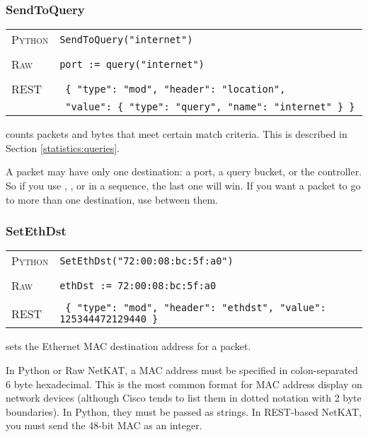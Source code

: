 \subsubsection{SendToQuery}

\bigskip
\begin{tabularx}{\linewidth}{lX}
\textsc{Python}   & \texttt{SendToQuery("internet")} \\ \\
\textsc{Raw}    & \texttt{port := query("internet")}     \\ \\
\textsc{REST} & \texttt{ \{ "type": "mod", "header": "location", } \\
 & \texttt{ "value": \{ "type": "query", "name": "internet" \} \} } 
\end{tabularx}

 counts packets and bytes that meet certain match criteria.  This is described in
Section \ref{statistics:queries}.   

A packet may have only one destination: a port, a query bucket, or the controller.  So if you use 
, , or  in a sequence, the last one will
win.  If you want a packet to go to more than one destination, use  between them.    

\subsubsection{SetEthDst}

\bigskip
\begin{tabularx}{\linewidth}{lX}
\textsc{Python}   & \texttt{SetEthDst("72:00:08:bc:5f:a0")} \\ \\
\textsc{Raw}    & \texttt{ethDst := 72:00:08:bc:5f:a0}     \\ \\
\textsc{REST} & \texttt{ \{ "type": "mod", "header": "ethdst", "value": 125344472129440 \} }
\end{tabularx}

 sets the Ethernet MAC destination address for a packet.    

In Python or Raw NetKAT, a MAC address must be specified in colon-separated 6 byte hexadecimal.  This is the most common format
for MAC address display on network devices (although Cisco tends to list them in dotted notation with 2 byte
boundaries).  In Python, they must be passed as strings.  In REST-based NetKAT, you must send the 48-bit MAC as 
an integer.  

